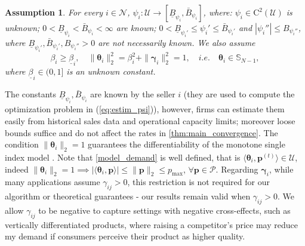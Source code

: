 \documentclass{article} %
\def\eqref#1{equation~\ref{#1}}
\renewcommand{\eqref}[1]{(\ref{#1})}
\newtheorem{assumption}[theorem]{Assumption}
\begin{document}
\begin{assumption}\label{ass:parameter space}
For every $i \in \mathcal{N}$, $\psi_i:\mathcal{U} \to [\underline{B}_{\psi_i},\bar{B}_{\psi_i}]$, where: $\psi_i \in \mathrm{C}^2(\mathcal{U})$ is unknown; $0<\underline{B}_{\psi_i} < \bar{B}_{\psi_i} <\infty$ are known; $0<\underline{B}_{\psi_i'} \leq \psi_i' \leq \bar{B}_{\psi_i'}$ and $|\psi_i''| \leq B_{\psi_i''}$, where $\underline{B}_{\psi_i'},\bar{B}_{\psi_i'},B_{\psi_i''}>0$ are not necessarily known. We also assume
$$
\textstyle \beta_i \geq \underline{\beta}_i,\quad \|\boldsymbol{\theta}_i\|_2^2=\beta_i^2 + \|\boldsymbol{\gamma}_i\|_2^2=1, \quad i.e.  \quad \boldsymbol{\theta}_i 
\in \mathbb{S}_{N-1},
$$
where $\underline{\beta}_i\in(0,1]$ is an unknown constant.
\end{assumption}
\noindent
The constants $\underline{B}_{\psi_i},\bar{B}_{\psi_i}$ are known by the seller $i$ (they are used to compute the optimization problem in \eqref{eq:estim_psi}), however, firms can estimate them easily from historical sales data and operational capacity limits; moreover loose bounds suffice and do not affect the rates in \cref{thm:main_convergence}. The condition $\|\boldsymbol{\theta}_i\|_2=1$ guarantees the differentiability of the monotone single index model \citep{chmielewski1981elliptically, balabdaoui2019least}. Note that \cref{model_demand} is well defined, that is $\langle\boldsymbol{\theta}_i,\mathbf{p}^{(t)} \rangle\in \mathcal{U}$, indeed $\|\boldsymbol{\theta}_i\|_2=1 \implies |\langle\boldsymbol{\theta}_i, \mathbf{p}\rangle|\leq \|\mathbf{p}\|_2 \leq p_{\max}$, $\forall \mathbf{p} \in \mathcal{P}$. Regarding $\boldsymbol{\gamma}_i$, while many applications assume $\gamma_{i j}>0$, this restriction is not required for our algorithm or theoretical guarantees - our results remain valid when $\gamma_{i j}>0$. We allow $\gamma_{i j}$ to be negative to capture settings with negative cross-effects, such as vertically differentiated products, where raising a competitor's price may reduce my demand if consumers perceive their product as higher quality.
\end{document}
